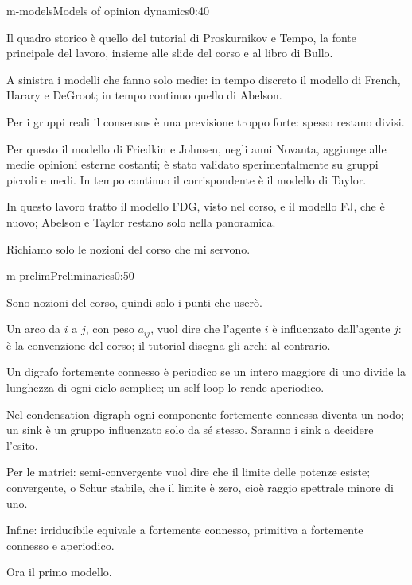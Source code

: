 \begin{slide}{m-models}{Models of opinion dynamics}{0:40}
  \begin{discorso}
    \item Il quadro storico è quello del tutorial di Proskurnikov e Tempo, la fonte principale del lavoro, insieme alle slide del corso e al libro di Bullo.
    \item A sinistra i modelli che fanno solo medie: in tempo discreto il modello di French, Harary e DeGroot; in tempo continuo quello di Abelson.
    \item Per i gruppi reali il {\color{red}} {\color{blue}consensus} è una previsione troppo forte: spesso restano divisi.
    \item Per questo il modello di Friedkin e Johnsen, negli anni Novanta, aggiunge alle medie opinioni esterne costanti; è stato validato sperimentalmente su gruppi piccoli e medi. In tempo continuo il corrispondente è il modello di Taylor.
    \item In questo lavoro tratto il modello FDG, visto nel corso, e il modello FJ, che è nuovo; Abelson e Taylor restano solo nella panoramica.
    \item Richiamo solo le nozioni del corso che mi servono.
  \end{discorso}
\end{slide}

\begin{slide}{m-prelim}{Preliminaries}{0:50}
  \begin{discorso}
    \item Sono nozioni del corso, quindi solo i punti che userò.
    \item Un arco da $i$ a $j$, con peso $a_{ij}$, vuol dire che l'agente $i$ è influenzato dall'agente $j$: è la convenzione del corso; il tutorial disegna gli archi al contrario.
    \item Un digrafo fortemente connesso è periodico se un intero maggiore di uno divide la lunghezza di ogni ciclo semplice; un self-loop lo rende aperiodico.
    \item Nel condensation digraph ogni componente fortemente connessa diventa un nodo; un sink è un gruppo influenzato solo da sé stesso. Saranno i sink a decidere l'esito.
    \item Per le matrici: semi-convergente vuol dire che il limite delle potenze esiste; convergente, o Schur stabile, che il limite è zero, cioè raggio spettrale minore di uno.
    \item Infine: irriducibile equivale a fortemente connesso, primitiva a fortemente connesso e aperiodico.
    \item Ora il primo modello.
  \end{discorso}
\end{slide}

